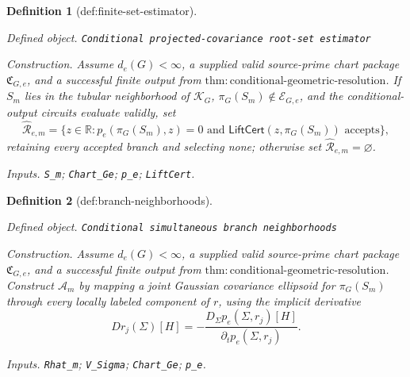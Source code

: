 \documentclass{article}
\newtheorem{definition}{Definition}
\begin{document}
\begin{definition}[def:finite-set-estimator]\label{def:finite-set-estimator}
\par\smallskip\noindent\emph{Defined object.} \texttt{Conditional projected-\allowbreak{}covariance root-\allowbreak{}set estimator}
\par\smallskip\noindent\emph{Construction.} Assume \(d_e(G)<\infty\), a supplied valid source-prime chart package \(\mathfrak C_{G,e}\), and a successful finite output from \(\mathrm{thm:conditional\mbox{-}geometric\mbox{-}resolution}\). If \(S_m\) lies in the tubular neighborhood of \(\mathcal K_G\), \(\pi_G(S_m)\notin\mathcal E_{G,e}\), and the conditional-output circuits evaluate validly, set
\[
\widehat{\mathcal R}_{e,m}=\{z\in\mathbb R:p_e(\pi_G(S_m),z)=0\text{ and }\mathsf{LiftCert}(z,\pi_G(S_m))\text{ accepts}\},
\]
retaining every accepted branch and selecting none; otherwise set \(\widehat{\mathcal R}_{e,m}=\varnothing\).
\par\smallskip\noindent\emph{Inputs.} \texttt{S\_\allowbreak{}m}; \texttt{Chart\_\allowbreak{}Ge}; \texttt{p\_\allowbreak{}e}; \texttt{LiftCert}.
\end{definition}

\begin{definition}[def:branch-neighborhoods]\label{def:branch-neighborhoods}
\par\smallskip\noindent\emph{Defined object.} \texttt{Conditional simultaneous branch neighborhoods}
\par\smallskip\noindent\emph{Construction.} Assume \(d_e(G)<\infty\), a supplied valid source-prime chart package \(\mathfrak C_{G,e}\), and a successful finite output from \(\mathrm{thm:conditional\mbox{-}geometric\mbox{-}resolution}\). Construct \(\mathcal A_m\) by mapping a joint Gaussian covariance ellipsoid for \(\pi_G(S_m)\) through every locally labeled component of \(r\), using the implicit derivative
\[
D r_j(\Sigma)[H]=-\frac{D_\Sigma p_e(\Sigma,r_j)[H]}{\partial_t p_e(\Sigma,r_j)}.
\]
\par\smallskip\noindent\emph{Inputs.} \texttt{Rhat\_\allowbreak{}m}; \texttt{V\_\allowbreak{}Sigma}; \texttt{Chart\_\allowbreak{}Ge}; \texttt{p\_\allowbreak{}e}.
\end{definition}
\end{document}
